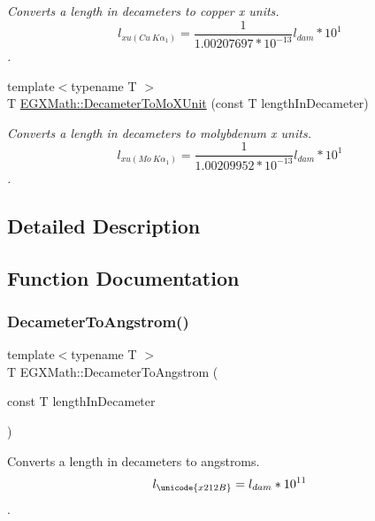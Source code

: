 \begin{DoxyCompactItemize}
\begin{DoxyCompactList}\small\item\em Converts a length in decameters to copper x units. \[ l_{xu(Cu\ K\alpha_1)}= \frac{1}{1.00207697*10^{-13}} l_{dam} * 10^{1}\]. \end{DoxyCompactList}\item 
{\footnotesize template$<$typename T $>$ }\\T \mbox{\hyperlink{group___e_g_x_math-_conversions-_length_conversions-_decameter-_non-_s_i_ga9e345feeb2568ded9fdceaf1d23d0ca6}{E\+G\+X\+Math\+::\+Decameter\+To\+Mo\+X\+Unit}} (const T length\+In\+Decameter)
\begin{DoxyCompactList}\small\item\em Converts a length in decameters to molybdenum x units. \[ l_{xu(Mo\ K\alpha_1)}=\frac{1}{1.00209952*10^{-13}} l_{dam} * 10^{1}\]. \end{DoxyCompactList}\end{DoxyCompactItemize}


\subsection{Detailed Description}


\subsection{Function Documentation}
\mbox{\label{group___e_g_x_math-_conversions-_length_conversions-_decameter-_non-_s_i_ga2ea722ea1c773432c2680fe6ebd67638}} 
\subsubsection{\texorpdfstring{Decameter\+To\+Angstrom()}{DecameterToAngstrom()}}
{\footnotesize\ttfamily template$<$typename T $>$ \\
T E\+G\+X\+Math\+::\+Decameter\+To\+Angstrom (\begin{DoxyParamCaption}\item[{const T}]{length\+In\+Decameter }\end{DoxyParamCaption})}



Converts a length in decameters to angstroms. \[ l_{\unicode{x212B}}=l_{dam} * 10^{11} \]. 

